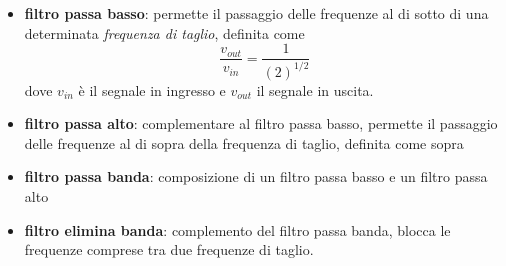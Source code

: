 \documentclass[a4paper,11pt]{article}
\begin{document}
\begin{itemize}
\item \textbf{filtro passa basso}: permette il passaggio delle frequenze al di sotto di una determinata \textit{frequenza di taglio}, definita come \[\frac{v_{out}}{v_{in}}=\frac{1}{(2)^{1/2}}\]
dove $v_{in}$ è il segnale in ingresso e $v_{out}$ il segnale in uscita.
\item \textbf{filtro passa alto}: complementare al filtro passa basso, permette il passaggio delle frequenze al di sopra della frequenza di taglio, definita come sopra
\item \textbf{filtro passa banda}: composizione di un filtro passa basso e un filtro passa alto
\item \textbf{filtro elimina banda}: complemento del filtro passa banda, blocca le frequenze comprese tra due frequenze di taglio.
\end{itemize}
\end{document}
